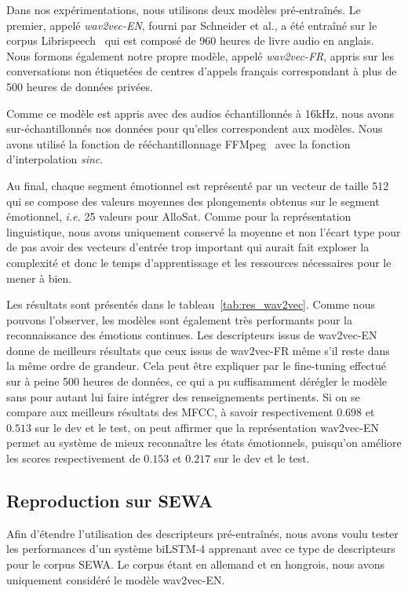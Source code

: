 Dans nos expérimentations, nous utilisons deux modèles pré-entraînés. Le premier, appelé \textit{wav2vec-EN}, fourni par Schneider et al.,  a été entraîné sur le corpus Librispeech~\cite{librispeech} qui est composé de 960 heures de livre audio en anglais.
Nous formons également notre propre modèle, appelé \textit{wav2vec-FR}, appris sur les conversations non étiquetées de centres d'appels français correspondant à plus de 500 heures de données privées.

Comme ce modèle est appris avec des audios échantillonnés à 16kHz, nous avons sur-échantillonnés nos données pour qu'elles correspondent aux modèles. Nous avons utilisé la fonction de rééchantillonnage FFMpeg~\cite{Tomar2006} avec la fonction d'interpolation \textit{sinc}.

Au final, chaque segment émotionnel est représenté par un vecteur de taille 512 qui se compose des valeurs moyennes des plongements obtenus sur le segment émotionnel, \textit{i.e.} 25 valeurs pour AlloSat. Comme pour la représentation linguistique, nous avons uniquement conservé la moyenne et non l'écart type pour de pas avoir des vecteurs d'entrée trop important qui aurait fait exploser la complexité et donc le temps d'apprentissage et les ressources nécessaires pour le mener à bien.



Les résultats sont présentés dans le tableau~\ref{tab:res_wav2vec}. Comme nous pouvons l'observer, les modèles sont également très performants pour la reconnaissance des émotions continues. Les descripteurs issus de wav2vec-EN donne de meilleurs résultats que ceux issus de wav2vec-FR même s'il reste dans la même ordre de grandeur. Cela peut être expliquer par le fine-tuning effectué sur à peine 500 heures de données, ce qui a pu suffisamment dérégler le modèle sans pour autant lui faire intégrer des renseignements pertinents. Si on se compare aux meilleurs résultats des MFCC, à savoir respectivement $0.698$ et $0.513$ sur le dev et le test, on peut affirmer que la représentation wav2vec-EN permet au système de mieux reconnaître les états émotionnels, puisqu'on améliore les scores respectivement de $0.153$ et $0.217$ sur le dev et le test.

\subsection{Reproduction sur SEWA}
Afin d'étendre l'utilisation des descripteurs pré-entraînés, nous avons voulu tester les performances d'un système biLSTM-4 apprenant avec ce type de descripteurs pour le corpus SEWA. Le corpus étant en allemand et en hongrois, nous avons uniquement considéré le modèle wav2vec-EN.

